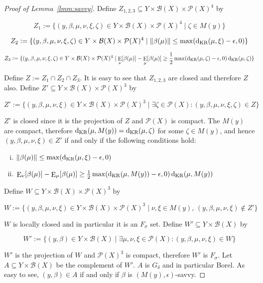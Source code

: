 \documentclass[11pt]{article}
\theoremstyle{definition}
\theoremstyle{plain}
\newcommand{\N}[1]{\lVert #1 \rVert}
\DeclareMathOperator{\E}{E}
\newcommand{\PM}{\mathcal{P}}
\newcommand{\DKR}{\operatorname{d}_{\textnormal{KR}}}
\newcommand{\Gm}{\mathcal{B}}
\begin{document}
\begin{proof}[Proof of Lemma~\ref{lmm:savvy}]

Define $Z_{1,2,3} \subseteq Y \times \Gm(X) \times \PM(X)^4$ by

$$Z_1:=\{(y,\beta,\mu,\nu,\xi,\zeta) \in Y \times \Gm(X) \times \PM(X)^4 \mid \zeta \in M(y)\}$$

$$Z_2:=\{(y,\beta,\mu,\nu,\xi,\zeta) \in Y \times \Gm(X) \times \PM(X)^4 \mid \N{\beta(\mu)} \leq \max(\DKR(\mu,\xi) - \epsilon, 0)\}$$

$$Z_3:=\{(y,\beta,\mu,\nu,\xi,\zeta) \in Y \times \Gm(X) \times \PM(X)^4 \mid \E_\nu[\beta(\mu)] - \E_\mu[\beta(\mu)] \geq \frac{1}{2}\max(\DKR(\mu,\zeta) - \epsilon, 0) \DKR(\mu,\zeta)\}$$

Define $Z := Z_1 \cap Z_2 \cap Z_3$. It is easy to see that $Z_{1,2,3}$ are closed and therefore $Z$ also. Define $Z' \subseteq Y \times \Gm(X) \times \PM(X)^3$ by

$$Z':=\{(y,\beta,\mu,\nu,\xi) \in Y \times \Gm(X) \times \PM(X)^3 \mid \exists \zeta \in \PM(X): (y,\beta,\mu,\nu,\xi,\zeta) \in Z\}$$

$Z'$ is closed since it is the projection of $Z$ and $\PM(X)$ is compact. The $M(y)$ are compact, therefore $\DKR(\mu,M(y))=\DKR(\mu,\zeta)$ for some $\zeta \in M(y)$, and hence $(y,\beta,\mu,\nu,\xi) \in Z'$ if and only if the following conditions hold:

\begin{enumerate}[i.]

\item $\N{\beta(\mu)} \leq \max(\DKR(\mu,\xi) - \epsilon, 0)$
\item $\E_\nu[\beta(\mu)] - \E_\mu[\beta(\mu)] \geq \frac{1}{2}\max(\DKR(\mu,M(y)) - \epsilon, 0) \DKR(\mu,M(y))$

\end{enumerate}

Define $W \subseteq Y \times \Gm(X) \times \PM(X)^3$ by

$$W:=\{(y,\beta,\mu,\nu,\xi) \in Y \times \Gm(X) \times \PM(X)^3 \mid \nu,\xi \in M(y),\, (y,\beta,\mu,\nu,\xi) \not\in Z'\}$$

$W$ is locally closed and in particular it is an $F_\sigma$ set. Define $W' \subseteq Y \times \Gm(X)$ by

$$W':=\{(y,\beta) \in Y \times \Gm(X) \mid \exists \mu,\nu,\xi \in \PM(X): (y,\beta,\mu,\nu,\xi) \in W\}$$

$W'$ is the projection of $W$ and $\PM(X)^3$ is compact, therefore $W'$ is $F_\sigma$. Let $A \subseteq Y \times \Gm(X)$ be the complement of $W'$. $A$ is $G_\delta$ and in particular Borel. As easy to see, $(y,\beta) \in A$ if and only if $\beta$ is $(M(y),\epsilon)$-savvy.


\end{proof}
\end{document}
